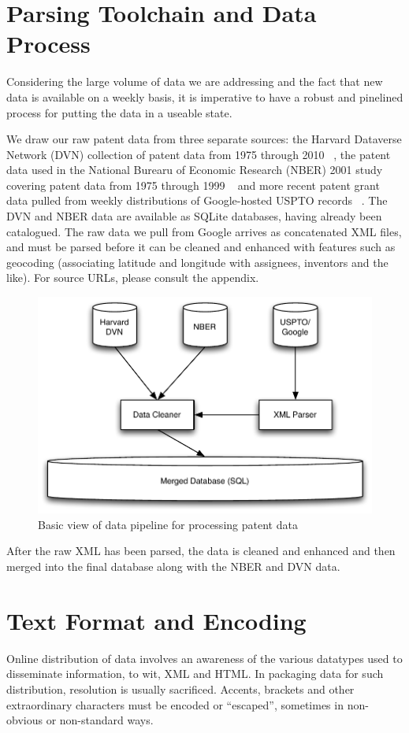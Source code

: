 \documentclass[11pt]{article}
\begin{document}
\section{Parsing Toolchain and Data Process}

Considering the large volume of data we are addressing and the fact that new data
is available on a weekly basis, it is imperative to have a robust and pinelined
process for putting the data in a useable state.

We draw our raw patent data from three separate sources: the Harvard Dataverse
Network (DVN) collection of patent data from 1975 through 2010
~\cite{disambiguation}, the patent data used in the National Burearu of
Economic Research (NBER) 2001 study covering patent data from 1975 through 1999
~\cite{NBERw8498} and more recent patent grant data pulled from weekly
distributions of Google-hosted USPTO records ~\cite{googlefiles}. The DVN and
NBER data are available as SQLite databases, having already been catalogued.
The raw data we pull from Google arrives as concatenated XML files, and must be
parsed before it can be cleaned and enhanced with features such as geocoding
(associating latitude and longitude with assignees, inventors and the like).
For source URLs, please consult the appendix.

\begin{figure}[htb]
  \centering
  \includegraphics[width=.5\linewidth]{figs/parsing_toolchain}
  \caption{Basic view of data pipeline for processing patent data}
\end{figure}

After the raw XML has been parsed, the data is cleaned and enhanced and then
merged into the final database along with the NBER and DVN data.

\section{Text Format and Encoding}

Online distribution of data involves an awareness of the various datatypes used
to disseminate information, to wit, XML and HTML. In packaging data for such
distribution, resolution is usually sacrificed. Accents, brackets and other
extraordinary characters must be encoded or ``escaped'', sometimes in
non-obvious or non-standard ways.
\end{document}
